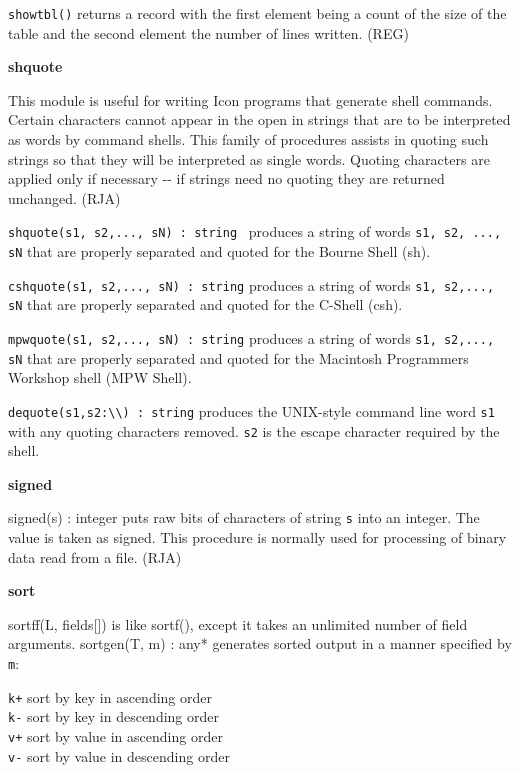 \texttt{showtbl()} returns a record with the first element being a count
of the size of the table and the second element the number of lines
written. (REG)

{\sffamily\bfseries
shquote}

This module is useful for writing Icon programs that generate
shell commands. Certain characters cannot appear
in the open in strings that are to be interpreted as
{\textquotedbl}words{\textquotedbl} by command shells. This family of
procedures assists in quoting such strings so that they will be
interpreted as single words. Quoting characters are applied only if
necessary -{}- if strings need no quoting they are returned unchanged.
(RJA)

\texttt{shquote(s1, s2,..., sN) : string} \ produces a string of words
\texttt{s1, s2, ..., sN} that are properly separated and quoted for the
Bourne Shell (sh).

\texttt{cshquote(s1, s2,..., sN) : string} produces a string of words
\texttt{s1, s2,..., sN} that are properly separated and quoted for the
C-Shell (csh).

\texttt{mpwquote(s1, s2,..., sN) : string} produces a string of words
\texttt{s1, s2,..., sN} that are properly separated and quoted for the
Macintosh Programmer{\textquotesingle}s Workshop shell (MPW Shell).

\texttt{dequote(s1,s2:{\textquotedbl}{\textbackslash}{\textbackslash}{\textquotedbl})
: string} produces the UNIX-style command line word \texttt{s1} with
any quoting characters removed. \texttt{s2} is the escape character
required by the shell.

{\sffamily\bfseries
signed}

\textsf{signed(s) : integer} puts raw bits of characters of string
\texttt{s} into an integer. The value is taken as signed. This
procedure is normally used for processing of binary data read from a
file. (RJA)

{\sffamily\bfseries
sort}

\textsf{sort}\textsf{ff(L, fields[])} is like
\textsf{sortf()}, except it takes an unlimited number of field arguments. \textsf{sortgen(T, m) : any*} generates sorted
output in a manner specified by \texttt{m}:

\texttt{{\textquotedbl}k+{\textquotedbl}} sort by key in ascending
order\\
\texttt{{\textquotedbl}k-{\textquotedbl}} sort by key in descending
order\\
\texttt{{\textquotedbl}v+{\textquotedbl}} sort by value in ascending
order\\
\texttt{{\textquotedbl}v-{\textquotedbl}} sort by value in descending
order

